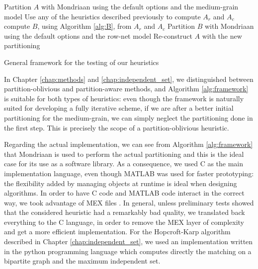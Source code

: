 \begin{algorithm}[h]
	\begin{algorithmic}
		\State Partition $A$ with Mondriaan using the default options and the medium-grain model
		\State Use any of the heuristics described previously to compute $A_r$ and $A_c$
		\State compute $B$, using Algorithm \ref{alg:B}, from $A_r$ and $A_c$
		\State Partition $B$ with Mondriaan using the default options and the row-net model
		\State Re-construct $A$ with the new partitioning
		\EndFor
	\end{algorithmic}
	\caption{General framework for the testing of our heuristics} \label{alg:framework}
\end{algorithm}

In Chapter \ref{chap:methods} and \ref{chap:independent_set}, we distinguished between partition-oblivious and partition-aware methods, and Algorithm \ref{alg:framework} is suitable for both types of heuristics: even though the framework is naturally suited for developing a fully iterative scheme, if we are after a better initial partitioning for the medium-grain, we can simply neglect the partitioning done in the first step. This is precisely the scope of a partition-oblivious heuristic.

Regarding the actual implementation, we can see from Algorithm \ref{alg:framework} that Mondriaan is used to perform the actual partitioning and this is the ideal case for its use as a software library. As a consequence, we used C as the main implementation language, even though MATLAB was used for faster prototyping: the flexibility added by managing objects at runtime  is ideal when designing algorithms. In order to have C code and MATLAB code interact in the correct way, we took advantage of MEX files \cite{mex}. In general, unless preliminary tests showed that the considered heuristic had a remarkably bad quality, we translated back everything to the C language, in order to remove the MEX layer of complexity and get a more efficient implementation. For the Hopcroft-Karp algorithm described in Chapter \ref{chap:independent_set}, we used an implementation \cite{hkarp_impl} written in the python programming language which computes directly the matching on a bipartite graph and the maximum independent set. 

